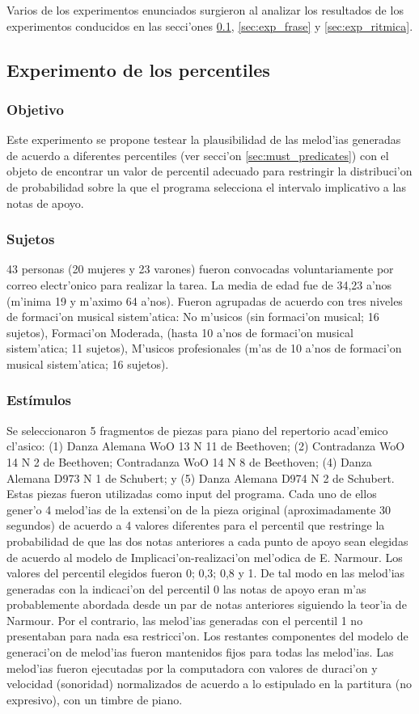 Varios de los experimentos enunciados surgieron al analizar los resultados de los experimentos conducidos en las secci'ones \ref{sec:exp_percentiles}, 
\ref{sec:exp_frase} y \ref{sec:exp_ritmica}.

\subsection{Experimento de los percentiles}
\label{sec:exp_percentiles}
\subsubsection{Objetivo}
Este experimento se propone testear la plausibilidad de las melod'ias generadas de acuerdo a diferentes percentiles (ver secci'on \ref{sec:must_predicates})
con el objeto de encontrar un valor de percentil adecuado para restringir la distribuci'on de probabilidad sobre la que el programa selecciona el 
intervalo implicativo a las notas de apoyo.

\subsubsection{Sujetos}
43 personas (20 mujeres y 23 varones) fueron convocadas voluntariamente por correo electr'onico para realizar la tarea. La media de edad fue de 34,23 a'nos 
(m'inima 19 y m'aximo 64 a'nos). Fueron agrupadas de acuerdo con tres niveles de formaci'on musical sistem'atica: No m'usicos (sin formaci'on musical; 16 sujetos), 
Formaci'on Moderada, (hasta 10 a'nos de formaci'on musical sistem'atica; 11 sujetos), M'usicos profesionales (m'as de 10 a'nos de formaci'on musical sistem'atica; 16 sujetos).

\subsubsection{Est\'imulos}
Se seleccionaron 5 fragmentos de piezas para piano del repertorio acad'emico cl'asico: (1) Danza Alemana WoO 13 N 11 de Beethoven; (2) Contradanza WoO 14 N 2 de Beethoven;
Contradanza WoO 14 N 8 de Beethoven; (4) Danza Alemana D973 N 1 de Schubert; y (5) Danza Alemana D974 N 2 de Schubert. Estas piezas fueron utilizadas como input del 
programa. Cada uno de ellos gener'o 4 melod'ias de la extensi'on de la pieza original (aproximadamente 30 segundos) de acuerdo a 4 valores diferentes para el percentil 
que restringe la probabilidad de que las dos notas anteriores a cada punto de apoyo sean elegidas de acuerdo al modelo de Implicaci'on-realizaci'on mel'odica de 
E. Narmour. Los valores del percentil elegidos fueron 0; 0,3; 0,8 y 1. De tal modo en las melod'ias generadas con la indicaci'on del percentil 0 las notas de apoyo 
eran m'as probablemente abordada desde un par de notas anteriores siguiendo la teor'ia de Narmour. Por el contrario, las melod'ias generadas con el percentil 1 no 
presentaban para nada esa restricci'on. Los restantes componentes del modelo de generaci'on de melod'ias fueron mantenidos fijos para todas las melod'ias. Las melod'ias 
fueron ejecutadas por la computadora con valores de duraci'on y velocidad (sonoridad) normalizados de acuerdo a lo estipulado en la partitura (no expresivo), 
con un timbre de piano.

